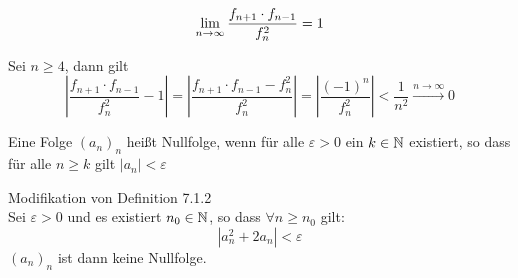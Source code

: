 \documentclass[../ana1u.tex]{subfiles}
\begin{document}
\begin{beh}[2]
    \[\lim\limits_{n\rightarrow\infty} \frac{f_{n+1} \cdot f_{n-1}}{f_n^2} = 1\]
\end{beh}
\begin{bew}
    Sei \(n \geq 4\), dann gilt
    \[\left|\frac{f_{n+1} \cdot f_{n-1}}{f_n^2} - 1\right| = \left|\frac{f_{n+1} \cdot f_{n-1} - f_n^2}{f_n^2}\right| = \left|\frac{(-1)^n}{f_n^2}\right| < \frac{1}{n^2} \overset{n \rightarrow \infty}{\rightarrow} 0\]
\end{bew}
\begin{defi}
    Eine Folge \((a_n)_n\) heißt Nullfolge, wenn für alle \(\varepsilon > 0\) ein \(k \in \mathbb{N}\) existiert, so dass für alle \(n \geq k\) gilt \(|a_n| < \varepsilon\)
\end{defi}
\begin{defi}
    Modifikation von Definition 7.1.2\\
    Sei \(\varepsilon > 0\) und es existiert \(n_0 \in \mathbb{N}\), so dass \(\forall n \geq n_0\) gilt:
    \[|a_n^2 + 2a_n| < \varepsilon\]
    \((a_n)_n\) ist dann keine Nullfolge.
\end{defi}
\end{document}
